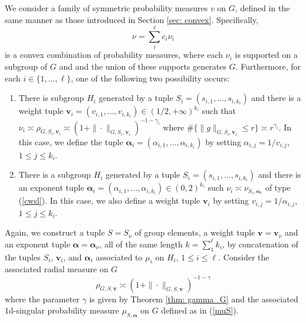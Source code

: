 \documentclass[pdflatex,sn-mathphys-num]{sn-jnl}%
\theoremstyle{thmstyleone}%
\theoremstyle{thmstyletwo}%
\theoremstyle{thmstylethree}%
\begin{document}
We consider a family of symmetric probability measures 
$v$ on $G$, defined in the same manner as those introduced in Section \ref{sec: convex}. Specifically, 
$$\nu=\sum _i^\ell c_i\nu_i$$
is a convex combination of probability measures, where each
$\nu_i$ is supported on a subgroup of $G$ and and the union of these supports generates $G$. Furthermore, for each $i\in \{1,\dots,\ell\}$, one of the following two possibility occurs:
\begin{enumerate}
    \item There is subgroup $H_i$ generated by a tuple $S_i=(s_{i,1},\dots,s_{i,k_i}) $ and there is a weight tuple $\mathbf v_i=(v_{i,1},\dots,v_{i,k_i})\in (1/2,+\infty)^{k_i}$ such that $\nu_i\asymp \rho_{G, S_i,\mathbf v_i}\asymp (1+\|\cdot\|_{G, S_i, \mathbf v_i})^{-1-\gamma_i}$ where 
    $\#\{\|g\|_{G, S_i,\mathbf v_i}\le r\}\asymp r^{\gamma_i}$.  In this case, we define the tuple $\bm{\alpha}_i=(\alpha_{i,1},\dots,\alpha_{i,k_i})$ by setting $\alpha_{i,j}=1/v_{i,j}$, $1\le j\le k_i$.
    \item There is a subgroup $H_i$ generated by a tuple $S_i=(s_{i,1},\dots,s_{i,k_i}) $ and there is an exponent tuple $\bm{\alpha}_i=(\alpha_{i,1},\dots,\alpha_{i,k_i})\in (0,2)^{k_i}$ such
    $\nu_i \asymp \nu_{S_i,\bm {\alpha}_i}$ of type (\ref{cwsl}). In this case, we also define a weight tuple $\mathbf v_i$ by setting $v_{i,j}=1/\alpha_{i,j}$, $1\le j\le k_i$.    \end{enumerate}

Again, we construct a tuple $S=S_\nu$ of group elements, a weight tuple $\mathbf v=\mathbf v_\nu$ and an exponent tuple $\bm{\alpha} = \bm{\alpha}_\nu$, all of the same length $k=\sum_1^\ell k_i$, by concatenation of the tuples $S_i$, $\mathbf v_i$, and $\bm{\alpha}_i$ associated to $\mu_i$ on $H_i$, $1\le i\le \ell$. Consider the associated radial measure on $G$ \begin{equation*}
\rho_{G, S,\mathbf v}\asymp(1+\|\cdot\|_{G, S,\mathbf v})^{-1-\gamma}
 \end{equation*}
where the parameter $\gamma$ is given by Theorem \ref{thm: gamma_G} and the associated 1d-singular probability measure $\mu_{S, \bm{\alpha}}$ on $G$ defined as in (\ref{muS}). 
\end{document}
